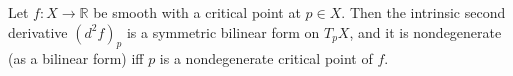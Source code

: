 Let $f: X \to \mathbb{R}$ be smooth with a critical point at $p \in X$. Then the intrinsic second derivative $(d^2 f)_p$ is a symmetric bilinear form on $T_p X$, and it is nondegenerate (as a bilinear form) iff $p$ is a nondegenerate critical point of $f$.
